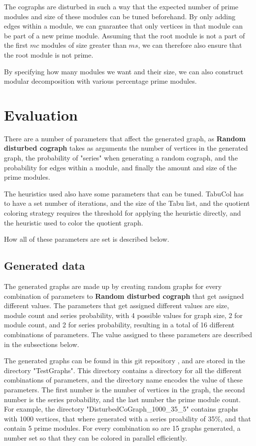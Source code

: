 \documentclass[a4paper]{article}
\begin{document}
The cographs are disturbed in such a way that the expected number of prime
modules and size of these modules can be tuned beforehand. By only adding edges
within a module, we can guarantee that only vertices in that module can be part
of a new prime module.  Assuming that the root module is not a part of the first
$mc$ modules of size greater than $ms$, we can therefore also ensure that the
root module is not prime.

By specifying how many modules we want and their size, we
can also construct modular decomposition with various percentage prime modules.

\section{Evaluation} 
\label{sec:Evaluation} 

There are a number of parameters that affect the generated graph, as
\textbf{Random disturbed cograph} takes as arguments the number of vertices in
the generated graph, the probability of "series" when generating a random cograph,
and the probability for edges within a module, and finally the amount and size of
the prime modules. 

The heuristics used also have some parameters that can be tuned. TabuCol has to
have a set number of iterations, and the size of the Tabu list, and the quotient
coloring strategy requires the threshold for applying the heuristic directly,
and the heuristic used to color the quotient graph.


How all of these parameters are set is described below.

\subsection{Generated data}

The generated graphs are made up by creating random graphs for every
combination of parameters to \textbf{Random disturbed cograph} that get assigned
different values. The parameters that get assigned different values are size,
module count and series probability, with 4 possible values for graph size, 2 for
module count, and 2 for series probability, resulting in a total of 16 different
combinations of parameters. The value assigned to these parameters are described
in the subsections below.

The generated graphs can be found in this git repository
\cite{BCGithub}, and are stored in the
directory "TestGraphs". This directory contains a directory for all the different
combinations of parameters, and the directory name encodes the value of these
parameters. The first number is the number of vertices in the graph, the second
number is the series probability, and the last number the prime module count.
For example, the directory "DisturbedCoGraph\_1000\_35\_5" contains graphs with 
1000 vertices, that where generated with a series proability of 35\%, and that
contain 5 prime modules. For every combination so are 15 graphs generated, 
a number set so that they can be colored in parallel efficiently.
\end{document}
